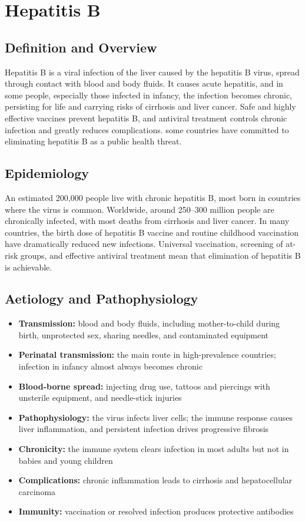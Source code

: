 \chapter{Hepatitis B}

\section*{Definition and Overview}
Hepatitis B is a viral infection of the liver caused by the hepatitis B virus, spread through contact with blood and body fluids. It causes acute hepatitis, and in some people, especially those infected in infancy, the infection becomes chronic, persisting for life and carrying risks of cirrhosis and liver cancer. Safe and highly effective vaccines prevent hepatitis B, and antiviral treatment controls chronic infection and greatly reduces complications. some countries have committed to eliminating hepatitis B as a public health threat.

\section*{Epidemiology}
An estimated 200,000 people live with chronic hepatitis B, most born in countries where the virus is common. Worldwide, around 250--300 million people are chronically infected, with most deaths from cirrhosis and liver cancer. In many countries, the birth dose of hepatitis B vaccine and routine childhood vaccination have dramatically reduced new infections. Universal vaccination, screening of at-risk groups, and effective antiviral treatment mean that elimination of hepatitis B is achievable.

\section*{Aetiology and Pathophysiology}
\begin{itemize}
    \item \textbf{Transmission:} blood and body fluids, including mother-to-child during birth, unprotected sex, sharing needles, and contaminated equipment
    \item \textbf{Perinatal transmission:} the main route in high-prevalence countries; infection in infancy almost always becomes chronic
    \item \textbf{Blood-borne spread:} injecting drug use, tattoos and piercings with unsterile equipment, and needle-stick injuries
    \item \textbf{Pathophysiology:} the virus infects liver cells; the immune response causes liver inflammation, and persistent infection drives progressive fibrosis
    \item \textbf{Chronicity:} the immune system clears infection in most adults but not in babies and young children
    \item \textbf{Complications:} chronic inflammation leads to cirrhosis and hepatocellular carcinoma
    \item \textbf{Immunity:} vaccination or resolved infection produces protective antibodies
\end{itemize}

